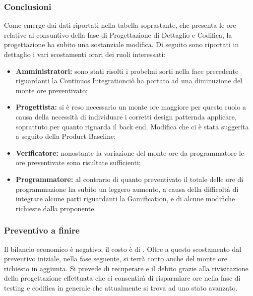 \subsubsection{Conclusioni}
Come emerge dai dati riportati nella tabella soprastante, che presenta le ore relative al consuntivo della fase di Progettazione di Dettaglio e Codifica, la progettazione ha subito una sostanziale modifica. Di seguito sono riportati in dettaglio i vari scostamenti orari dei ruoli interessati:
\begin{itemize}
	\item \textbf{Amministratori:} sono stati risolti i probelmi sorti nella face precedente riguardanti la Continuos Integration\glosp ciò ha portato ad una diminuzione del monte ore preventivato;
	\item \textbf{Progettista:} si è reso necessario un monte ore maggiore per questo ruolo a causa della necessità di individuare i corretti design pattern\glosp da applicare, soprattuto per quanto riguarda il back end\glosp. Modifica che ci è stata suggerita a seguito della Product Baseline\glo; 
	\item \textbf{Verificatore:} nonostante la variazione del monte ore da programmatore le ore preventivate sono risultate sufficienti;
	\item \textbf{Programmatore:} al contrario di quanto preventivato il totale delle ore di programmazione ha subito un leggero aumento, a causa della difficoltà di integrare alcune parti riguardanti la Gamification\glo, e di alcune modifiche richieste dalla proponente.
\end{itemize}

\subsubsection{Preventivo a finire}
Il bilancio economico è negativo, il costo è di . Oltre a questo scostamento dal preventivo iniziale, nella fase seguente, si terrà conto anche del monte ore richiesto in aggiunta. Si prevede di recuperare e il debito grazie alla rivisitazione della progettazione effettuata che ci consentirà di risparmiare ore nella fase di testing e codifica in generale che attualmente si trova ad uno stato avanzato. 

